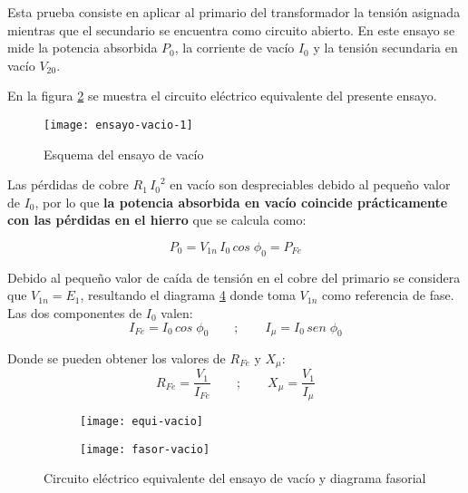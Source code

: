 Esta prueba consiste en aplicar al primario del transformador la tensión asignada mientras que el secundario se encuentra como circuito abierto. En este ensayo se mide la potencia absorbida $P_{0}$, la corriente de vacío $I_{0}$ y la tensión secundaria en vacío $V_{20}$.


En la figura \ref{fig:equi-ensayo-vacio} se muestra el circuito eléctrico equivalente del presente ensayo.

\begin{figure}[H]
	\centering
	\texttt{[image: ensayo-vacio-1]}
	\caption{Esquema del ensayo de vacío}
	\label{fig:ensayo-vacio}
\end{figure}

Las pérdidas de cobre $R_{1}\,{I_{0}}^2$ en vacío son despreciables debido al pequeño valor de $I_{0}$, por lo que \textbf{la potencia absorbida en vacío coincide prácticamente con las pérdidas en el hierro} que se calcula como:

\begin{equation*}
	P_{0}=V_{1n}\,I_{0}\,cos\;\phi_{0}=P_{Fe}
\end{equation*}



Debido al pequeño valor de caída de tensión en el cobre del primario se considera que  $V_{1n}=E_{1}$, resultando el diagrama \ref{fig:vacio-fasores} donde toma $V_{1n}$ como referencia de fase.\\


Las dos componentes de $I_{0}$ valen:
\begin{equation*}
	I_{Fe}=I_{0}\,cos\;\phi_{0}\qquad;\qquad I_{\mu}=I_{0}\,sen\;\phi_{0}
\end{equation*}

Donde se pueden obtener los valores de $R_{Fe}$ y $X_{\mu}$:
\begin{equation*}
	R_{Fe}=\dfrac{V_{1}}{I_{Fe}}\qquad;\qquad X_{\mu}=\dfrac{V_{1}}{I_{\mu}}
\end{equation*}
\begin{figure}[H]
	\centering
	\begin{subfigure}[b]{.3\linewidth}
		\texttt{[image: equi-vacio]}
		\caption{}
		\label{fig:equi-ensayo-vacio}
	\end{subfigure}
	\begin{subfigure}[b]{.27\linewidth}
		\texttt{[image: fasor-vacio]}
		\caption{}
		\label{fig:vacio-fasores}
	\end{subfigure}
	\caption{Circuito eléctrico equivalente del ensayo de vacío y diagrama fasorial}
\end{figure}

